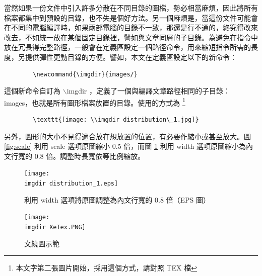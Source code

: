 \documentclass[12pt, a4paper]{article}
\begin{document}
當然如果一份文件中引入許多分散在不同目錄的圖檔，勢必相當麻煩，因此將所有檔案都集中到預設的目錄，也不失是個好方法。另一個麻煩是，當這份文件可能會在不同的電腦編譯時，如果兩部電腦的目錄不一致，那還是行不通的，終究得改來改去，不如統一放在某個固定目錄裡，譬如與文章同層的子目錄。為避免在指令中放在冗長得完整路徑，一般會在定義區設定一個路徑命令，用來縮短指令所需的長度，另提供彈性更動目錄的方便。譬如，本文在定義區設定以下的新命令：

\bigskip
	\begin{lstlisting}
		\newcommand{\imgdir}{images/}	
	\end{lstlisting}

這個新命令自訂為  $\backslash$imgdir ，定義了一個與編譯文章路徑相同的子目錄：images，也就是所有圖形檔案放置的目錄。使用的方式為 \footnote{本文字第二張圖片開始，採用這個方式，請對照 TEX 檔}

\bigskip
	\begin{lstlisting}
		\texttt{[image: \\imgdir distribution\_1.jpg]}	
	\end{lstlisting}
	
另外，圖形的大小不見得適合放在想放置的位置，有必要作縮小或甚至放大。圖 \ref{fig:scale}  利用  scale 選項原圖縮小 0.5 倍，而圖 \ref{fig:width} 利用 width 選項原圖縮小為內文行寬的 0.8 倍。調整時長寬依等比例縮放。\\

\begin{figure}[H]
    \centering
    \texttt{[image: \\imgdir distribution\_1.eps]}
    \caption{利用 width 選項將原圖調整為內文行寬的 0.8 倍（EPS 圖）}
    \label{fig:width}
\end{figure}

\begin{figure}
\centering
\texttt{[image: \\imgdir XeTex.PNG]}
\caption{文繞圖示範}\label{fig:PNG}
\end{figure}
\end{document}
